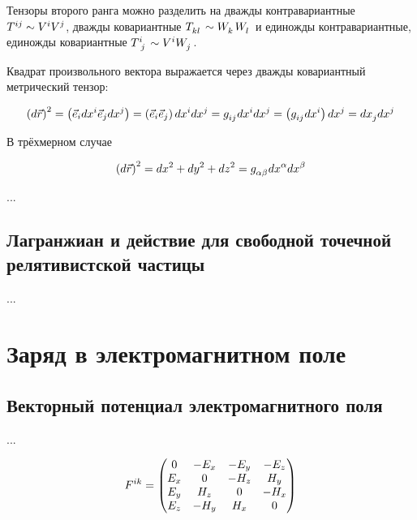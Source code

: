 \documentclass{article}
\begin{document}
Тензоры второго ранга можно разделить на дважды контравариантные $\tensor{T}{^i^j}\sim\tensor{V}{^i}\tensor{V}{^j}$, дважды ковариантные $\tensor{T}{_k_l}\sim\tensor{W}{_k}\tensor{W}{_l}$ и единожды контравариантные, единожды ковариантные $\tensor{T}{^i_j}\sim\tensor{V}{^i}\tensor{W}{_j}$.

Квадрат произвольного вектора выражается через дважды ковариантный метрический тензор:

\begin{equation*}
    \left(d\vec{r}\right)^2=\left(\vec{e}_i d\tensor{x}{^i}\vec{e}_j d\tensor{x}{^j}\right)=\left(\vec{e}_i\vec{e}_j\right)d\tensor{x}{^i}d\tensor{x}{^j}=\tensor{g}{_i_j}d\tensor{x}{^i}d\tensor{x}{^j}=\left(\tensor{g}{_i_j}d\tensor{x}{^i}\right)d\tensor{x}{^j}=d\tensor{x}{_j}d\tensor{x}{^j}
\end{equation*}

В трёхмерном случае 

\begin{equation*}
     \left(d\vec{r}\right)^2=dx^2+dy^2+dz^2=\tensor{g}{_\alpha_\beta}d\tensor{x}{^\alpha}d\tensor{x}{^\beta}
\end{equation*}

...

\subsection{Лагранжиан и действие для свободной точечной релятивистской частицы}

...

\section{Заряд в электромагнитном поле}

\subsection{Векторный потенциал электромагнитного поля}

...

\begin{equation}\label{eq:fmatrix}
    \tensor{F}{^i^k} =
    \begin{pmatrix}
        0 & -E_x & -E_y & -E_z \\
        E_x & 0 & -H_z & H_y \\
        E_y & H_z & 0 & -H_x \\
        E_z & -H_y & H_x & 0
    \end{pmatrix}
\end{equation}
\end{document}
